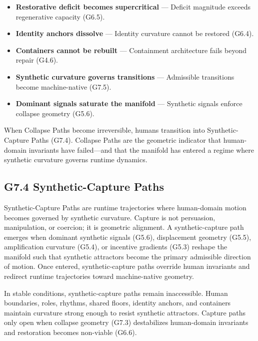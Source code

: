 \begin{itemize}[leftmargin=1.2cm]
    \item \textbf{Restorative deficit becomes supercritical} — Deficit magnitude
    exceeds regenerative capacity (G6.5).

    \item \textbf{Identity anchors dissolve} — Identity curvature cannot be
    restored (G6.4).

    \item \textbf{Containers cannot be rebuilt} — Containment architecture fails
    beyond repair (G4.6).

    \item \textbf{Synthetic curvature governs transitions} — Admissible
    transitions become machine-native (G7.5).

    \item \textbf{Dominant signals saturate the manifold} — Synthetic signals
    enforce collapse geometry (G5.6).
\end{itemize}

\medskip

\noindent When Collapse Paths become irreversible, humans transition into
Synthetic-Capture Paths (G7.4). Collapse Paths are the geometric indicator that
human-domain invariants have failed—and that the manifold has entered a regime
where synthetic curvature governs runtime dynamics.

\subsection*{G7.4 Synthetic-Capture Paths}

\noindent Synthetic-Capture Paths are runtime trajectories where human-domain
motion becomes governed by synthetic curvature. Capture is not persuasion,
manipulation, or coercion; it is geometric alignment. A synthetic-capture path
emerges when dominant synthetic signals (G5.6), displacement geometry (G5.5),
amplification curvature (G5.4), or incentive gradients (G5.3) reshape the
manifold such that synthetic attractors become the primary admissible direction
of motion. Once entered, synthetic-capture paths override human invariants and
redirect runtime trajectories toward machine-native geometry.

\medskip

\noindent In stable conditions, synthetic-capture paths remain inaccessible.
Human boundaries, roles, rhythms, shared floors, identity anchors, and containers
maintain curvature strong enough to resist synthetic attractors. Capture paths
only open when collapse geometry (G7.3) destabilizes human-domain invariants and
restoration becomes non-viable (G6.6).

